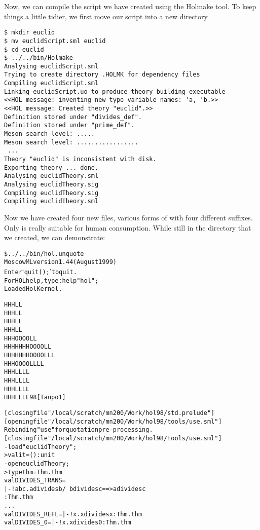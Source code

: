 Now, we can compile the script we have created using the
\textsf{Holmake} tool.  To keep things a little tidier, we first move
our script into a new directory.

\begin{session}
\begin{verbatim}
$ mkdir euclid
$ mv euclidScript.sml euclid
$ cd euclid
$ ../../bin/Holmake
Analysing euclidScript.sml
Trying to create directory .HOLMK for dependency files
Compiling euclidScript.sml
Linking euclidScript.uo to produce theory building executable
<<HOL message: inventing new type variable names: 'a, 'b.>>
<<HOL message: Created theory "euclid".>>
Definition stored under "divides_def".
Definition stored under "prime_def".
Meson search level: .....
Meson search level: .................
 ...
Theory "euclid" is inconsistent with disk.
Exporting theory ... done.
Analysing euclidTheory.sml
Analysing euclidTheory.sig
Compiling euclidTheory.sig
Compiling euclidTheory.sml
\end{verbatim}
\end{session}

Now we have created four new files, various forms of 
with four different suffixes.  Only  is really
suitable for human consumption.  While still in the 
directory that we created, we can demonstrate:

\begin{session}
\begin{alltt}
\$ ../../bin/hol.unquote
Moscow ML version 1.44 (August 1999)
Enter `quit();' to quit.
For HOL help, type: help "hol";
Loaded Hol Kernel.

        HHH                 LL
        HHH                  LL
        HHH                   LL
        HHH                    LL
        HHH          OOOO       LL
        HHHHHHH     OO  OO       LL
        HHHHHHH     OO  OO       LLL
        HHH          OOOO        LLLL
        HHH                     LL  LL
        HHH                    LL    LL
        HHH                   LL      LL
        HHH                  LL        LL98 [Taupo 1]

[closing file "/local/scratch/mn200/Work/hol98/std.prelude"]
[opening file "/local/scratch/mn200/Work/hol98/tools/use.sml"]
Rebinding "use" for quotation pre-processing.
[closing file "/local/scratch/mn200/Work/hol98/tools/use.sml"]
- load "euclidTheory";
> val it = () : unit
- open euclidTheory;
> type thm = Thm.thm
  val DIVIDES_TRANS =
    |- !a b c. a divides b /\ b divides c ==> a divides c
    : Thm.thm
  ...
  val DIVIDES_REFL = |- !x. x divides x : Thm.thm
  val DIVIDES_0 = |- !x. x divides 0 : Thm.thm
\end{alltt}
\end{session}

